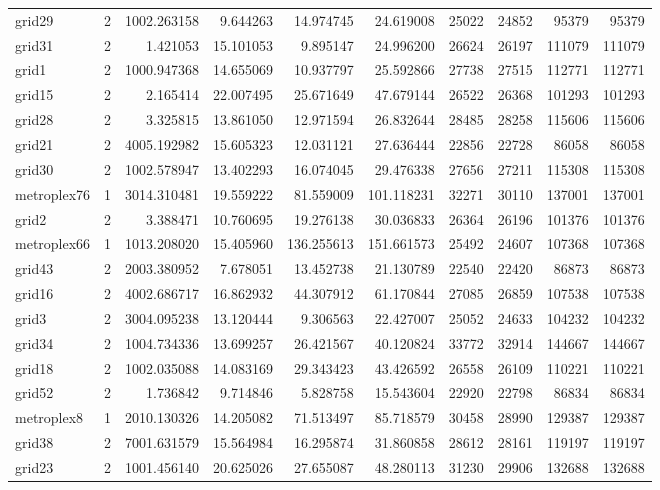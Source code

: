 \begin{longtable}{|l|r|r|r|r|r|r|r|r|r|}
grid29 & 2 & 1002.263158 & 9.644263 & 14.974745 & 24.619008 & 25022 & 24852 & 95379 & 95379 \\
grid31 & 2 & 1.421053 & 15.101053 & 9.895147 & 24.996200 & 26624 & 26197 & 111079 & 111079 \\
grid1 & 2 & 1000.947368 & 14.655069 & 10.937797 & 25.592866 & 27738 & 27515 & 112771 & 112771 \\
grid15 & 2 & 2.165414 & 22.007495 & 25.671649 & 47.679144 & 26522 & 26368 & 101293 & 101293 \\
grid28 & 2 & 3.325815 & 13.861050 & 12.971594 & 26.832644 & 28485 & 28258 & 115606 & 115606 \\
grid21 & 2 & 4005.192982 & 15.605323 & 12.031121 & 27.636444 & 22856 & 22728 & 86058 & 86058 \\
grid30 & 2 & 1002.578947 & 13.402293 & 16.074045 & 29.476338 & 27656 & 27211 & 115308 & 115308 \\
metroplex76 & 1 & 3014.310481 & 19.559222 & 81.559009 & 101.118231 & 32271 & 30110 & 137001 & 137001 \\
grid2 & 2 & 3.388471 & 10.760695 & 19.276138 & 30.036833 & 26364 & 26196 & 101376 & 101376 \\
metroplex66 & 1 & 1013.208020 & 15.405960 & 136.255613 & 151.661573 & 25492 & 24607 & 107368 & 107368 \\
grid43 & 2 & 2003.380952 & 7.678051 & 13.452738 & 21.130789 & 22540 & 22420 & 86873 & 86873 \\
grid16 & 2 & 4002.686717 & 16.862932 & 44.307912 & 61.170844 & 27085 & 26859 & 107538 & 107538 \\
grid3 & 2 & 3004.095238 & 13.120444 & 9.306563 & 22.427007 & 25052 & 24633 & 104232 & 104232 \\
grid34 & 2 & 1004.734336 & 13.699257 & 26.421567 & 40.120824 & 33772 & 32914 & 144667 & 144667 \\
grid18 & 2 & 1002.035088 & 14.083169 & 29.343423 & 43.426592 & 26558 & 26109 & 110221 & 110221 \\
grid52 & 2 & 1.736842 & 9.714846 & 5.828758 & 15.543604 & 22920 & 22798 & 86834 & 86834 \\
metroplex8 & 1 & 2010.130326 & 14.205082 & 71.513497 & 85.718579 & 30458 & 28990 & 129387 & 129387 \\
grid38 & 2 & 7001.631579 & 15.564984 & 16.295874 & 31.860858 & 28612 & 28161 & 119197 & 119197 \\
grid23 & 2 & 1001.456140 & 20.625026 & 27.655087 & 48.280113 & 31230 & 29906 & 132688 & 132688 \\

\end{longtable}
